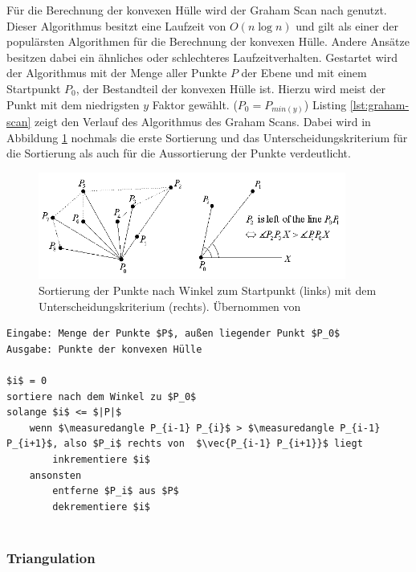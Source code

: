 Für die Berechnung der konvexen Hülle wird der Graham Scan nach \citet{graham1972efficient} genutzt. Dieser Algorithmus besitzt eine Laufzeit von \(O(n \log n)\) und gilt als einer der populärsten Algorithmen für die Berechnung der konvexen Hülle. Andere Ansätze besitzen dabei ein ähnliches oder schlechteres Laufzeitverhalten. Gestartet wird der Algorithmus mit der Menge aller Punkte \(P\) der Ebene und mit einem Startpunkt \(P_0\), der Bestandteil der konvexen Hülle ist. Hierzu wird meist der Punkt mit dem niedrigsten \(y\) Faktor gewählt. (\(P_0=P_{min(y)}\)) Listing \ref{lst:graham-scan} zeigt den Verlauf des Algorithmus des Graham Scans. Dabei wird in Abbildung \ref{fig:convexhull} nochmals die erste Sortierung und das Unterscheidungskriterium für die Sortierung als auch für die Aussortierung der Punkte verdeutlicht. \citep{convexHull} \\

\begin{figure}
  \centering
	\includegraphics[width=0.9\textwidth]{content/images/methods/convexhull.png} 
  \caption{Sortierung der Punkte nach Winkel zum Startpunkt (links) mit dem Unterscheidungskriterium (rechts). Übernommen von \citet{convexHull}}
  \label{fig:convexhull}
\end{figure}

\begin{lstlisting}[mathescape,caption=Graham Scan Algorithmus, label=lst:graham-scan]
Eingabe: Menge der Punkte $P$, außen liegender Punkt $P_0$
Ausgabe: Punkte der konvexen Hülle

$i$ = 0
sortiere nach dem Winkel zu $P_0$
solange $i$ <= $|P|$
    wenn $\measuredangle P_{i-1} P_{i}$ > $\measuredangle P_{i-1} P_{i+1}$, also $P_i$ rechts von  $\vec{P_{i-1} P_{i+1}}$ liegt
        inkrementiere $i$
    ansonsten
        entferne $P_i$ aus $P$
        dekrementiere $i$
    
\end{lstlisting} 


\subsubsection{Triangulation}

